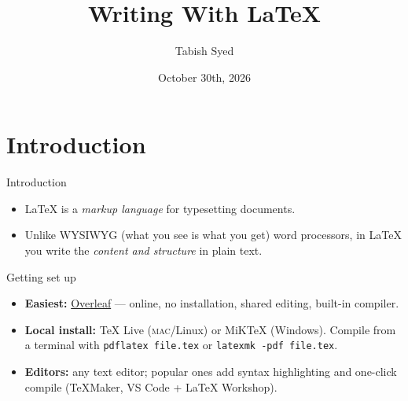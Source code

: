 \documentclass[aspectratio=43]{beamer}
\author[Tabish]{Tabish Syed}
\institute[McGill]{McGill University}
\title[Latex Workshop]{Writing With \LaTeX{}}
\date{October 30th, 2026}
\begin{document}
\maketitle

\section{Introduction}
\begin{frame}{Introduction}

            \begin{itemize}
                \item<1-> \LaTeX{} is a \emph{markup language} for typesetting documents.
                \item<2-> Unlike WYSIWYG (what you see is what you get) word processors, in \LaTeX{} you write the \emph{content and structure} in plain text.
            \end{itemize}
\end{frame}

\begin{frame}{Getting set up}
\begin{itemize}
  \item<1-> \textbf{Easiest:} \href{https://www.overleaf.com}{Overleaf} --- online,
        no installation, shared editing, built-in compiler.
  \item<2-> \textbf{Local install:} TeX Live (\textsc{mac}/Linux) or MiKTeX (Windows).
        Compile from a terminal with \texttt{pdflatex file.tex} or
        \texttt{latexmk -pdf file.tex}.
  \item<3-> \textbf{Editors:} any text editor; popular ones add syntax highlighting and one-click compile (TeXMaker, VS Code + LaTeX Workshop).
\end{itemize}
\end{frame}
\end{document}
